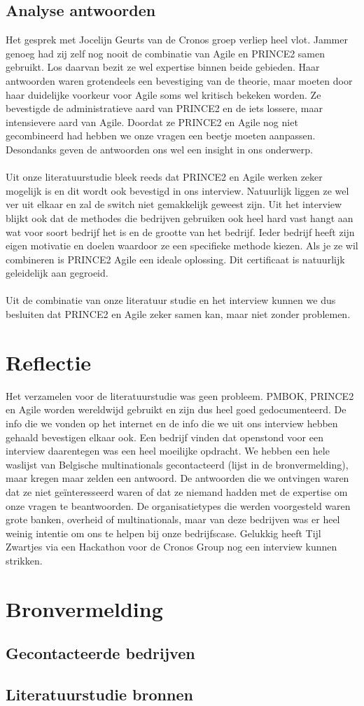 \documentclass[]{article}
\begin{document}
\subsection{Analyse antwoorden}
Het gesprek met Jocelijn Geurts van de Cronos groep verliep heel vlot. Jammer genoeg had zij zelf nog nooit de combinatie van Agile en PRINCE2 samen gebruikt. Los daarvan bezit ze wel expertise binnen beide gebieden. Haar antwoorden waren grotendeels een bevestiging van de theorie, maar moeten door haar duidelijke voorkeur voor Agile soms wel kritisch bekeken worden. Ze bevestigde de administratieve aard van PRINCE2 en de iets lossere, maar intensievere aard van Agile. Doordat ze PRINCE2 en Agile nog niet gecombineerd had hebben we onze vragen een beetje moeten aanpassen. Desondanks geven de antwoorden ons wel een insight in ons onderwerp. \\\\
Uit onze literatuurstudie bleek reeds dat PRINCE2 en Agile werken zeker mogelijk is en dit wordt ook bevestigd in ons interview. Natuurlijk liggen ze wel ver uit elkaar en zal de switch niet gemakkelijk geweest zijn. Uit het interview blijkt ook dat de methodes die bedrijven gebruiken ook heel hard vast hangt aan wat voor soort bedrijf het is en de grootte van het bedrijf. Ieder bedrijf heeft zijn eigen motivatie en doelen waardoor ze een specifieke methode kiezen. Als je ze wil combineren is PRINCE2 Agile een ideale oplossing. Dit certificaat is natuurlijk geleidelijk aan gegroeid. \\\\
Uit de combinatie van onze literatuur studie en het interview kunnen we dus besluiten dat PRINCE2 en Agile zeker samen kan, maar niet zonder problemen.

\section{Reflectie}
Het verzamelen voor de literatuurstudie was geen probleem. PMBOK, PRINCE2 en Agile worden wereldwijd gebruikt en zijn dus heel goed gedocumenteerd. De info die we vonden op het internet en de info die we uit ons interview hebben gehaald bevestigen elkaar ook. Een bedrijf vinden dat openstond voor een interview daarentegen was een heel moeilijke opdracht. We hebben een hele waslijst van Belgische multinationals gecontacteerd (lijst in de bronvermelding), maar kregen maar zelden een antwoord. De antwoorden die we ontvingen waren dat ze niet geïnteresseerd waren of dat ze niemand hadden met de expertise om onze vragen te beantwoorden. De organisatietypes die werden voorgesteld waren grote banken, overheid of multinationals, maar van deze bedrijven was er heel weinig intentie om ons te helpen bij onze bedrijfscase. Gelukkig heeft Tijl Zwartjes via een Hackathon voor de Cronos Group nog een interview kunnen strikken.
\section{Bronvermelding}

\subsection{Gecontacteerde bedrijven}

\subsection{Literatuurstudie bronnen}
\printbibliography
\end{document}
